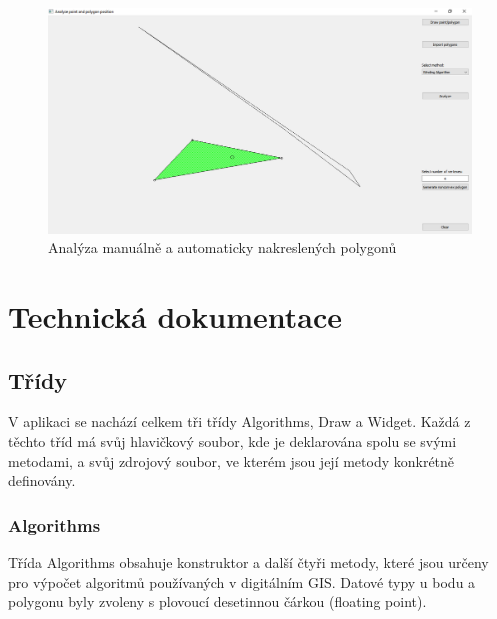\documentclass[a4paper,11pt,twoside]{article}
\begin{document}
\vspace{0.2cm}
\begin{figure}[hbt!] 
\begin{center}
\includegraphics[width=15cm]{pictures/manuallymadepolygon.png} 
\caption[Analýza manuálně a automaticky nakreslených polygonů]{Analýza manuálně a automaticky nakreslených polygonů}
\label{fig:manuallymadepolygon}
\end{center}
\end{figure}


\newpage
{}

\vspace*{-1cm}
\section{Technická dokumentace}
\subsection{Třídy}
V aplikaci se nachází celkem tři třídy Algorithms, Draw a Widget. Každá z těchto tříd má svůj hlavičkový soubor, kde je deklarována spolu se svými metodami, a svůj zdrojový soubor, ve kterém jsou její metody konkrétně definovány.
\subsubsection{Algorithms}
Třída Algorithms obsahuje konstruktor a další čtyři metody, které jsou určeny pro výpočet algoritmů používaných v digitálním GIS. Datové typy u bodu a polygonu byly zvoleny s plovoucí desetinnou čárkou (floating point).\\
\end{document}
